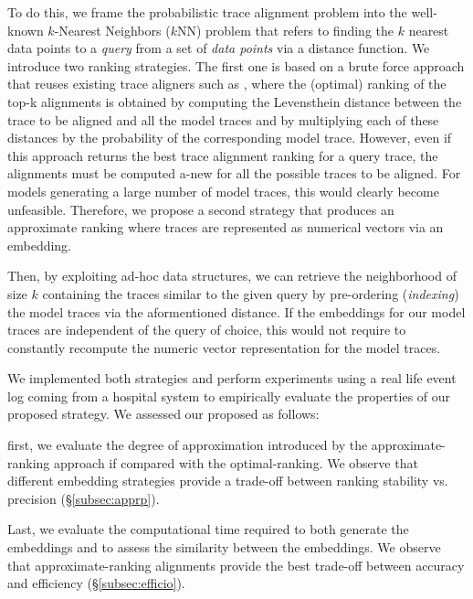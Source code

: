 To do this, we frame the probabilistic trace alignment problem into the well-known $k$-Nearest Neighbors ($k$NN) problem \cite{Altman} that refers to finding the $k$ nearest data points to a \textit{query}  from a set  of \textit{data points} via a distance function.
We introduce two ranking strategies. The first one is based on a brute force approach that reuses existing trace aligners such as \cite{DBLP:conf/edoc/AdriansyahDA11,LeoniM17}, where the (optimal) ranking of the top-k alignments is obtained by computing the Levensthein distance between the trace to be aligned and all the model traces and by multiplying each of these distances by the probability of the corresponding model trace. However, even if this approach returns the best trace alignment ranking for a query trace, the alignments must be computed a-new for all the possible traces to be aligned. For models generating a large number of model traces, this would clearly become unfeasible. Therefore, we propose a second strategy that produces an approximate ranking where traces are represented as numerical vectors via an embedding. {Then, by exploiting ad-hoc data structures,
	we can retrieve the neighborhood of size $k$ containing the traces similar to the given query  by pre-ordering (\textit{indexing}) the model traces  via the aformentioned distance. 
	If the embeddings for our model traces are independent of the query of choice, this would not require to constantly recompute the numeric vector representation for the model traces.
	
	We implemented both strategies and perform experiments using a real life event log coming from a hospital system to empirically evaluate the properties of our proposed  strategy. We assessed our proposed as follows:
\begin{mylist}
	\item first, we evaluate the degree of approximation introduced by the approximate-ranking approach if compared with the optimal-ranking. We observe that different embedding strategies provide a trade-off between ranking stability vs. precision (\S\ref{subsec:apprp}).
	\item Last, we evaluate the computational time required to both generate the embeddings and to assess the similarity between the embeddings. We observe that approximate-ranking alignments provide the best trade-off between accuracy and efficiency (\S\ref{subsec:efficio}).
\end{mylist}

}
